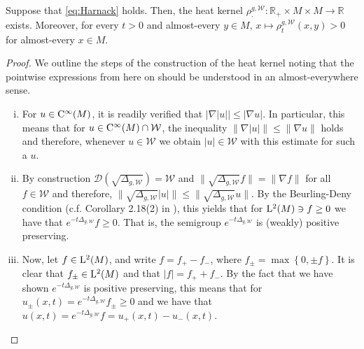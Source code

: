 \documentclass[AMS,STIX1COL]{WileyNJD-v2}
\numberwithin{equation}{section}
\renewcommand{\~}{\tilde}
\renewcommand{\-}{\bar}
\newcommand{\R}{\mathbb{R}}
\newcommand{\8}{\infty}
\newcommand{\cW}{\mathcal{W}}
\newcommand{\mdot}{\cdotp}
\newcommand{\dbrac}[1]{\left\{#1\right\}}
\newcommand{\modulus}[1]{|#1|}
\newcommand{\set}[1]{\dbrac{#1}}
\newcommand{\dom}{ {\mathcal{D}}}
\newcommand{\intersect}{\cap}
\newcommand{\norm}[1]{\| #1 \|}			%
\newcommand{\Lp}[2][{}]{{\rm L}^{#2}_{\rm #1}}		%
\newcommand{\Ck}[2][{}]{{\rm C}^{#2}_{\rm #1}}		%
\newcommand{\hk}{\rho}
\begin{document}
\begin{prop}
\label{prop:MainRed}
Suppose that \eqref{eq:Harnack} holds. Then, the heat
kernel $\hk^{g,\cW}_{\mdot}: \R_{+} \times M \times M \to \R$
exists. Moreover, for every $t > 0$ and almost-every $y \in M$,  $x\mapsto \hk^{g,\cW}_t(x,y) > 0$ for almost-every $x \in M$.
\end{prop} 
\begin{proof}
We outline the steps of the construction of the heat kernel
noting that the pointwise expressions from here on should be
understood in an almost-everywhere sense.
\begin{enumerate}[(i)]
\item For $u \in \Ck{\infty}(M)$, it is readily verified that 
	$\modulus{ \nabla \modulus{u}} \leq \modulus{ \nabla u}.$
	In particular, this means that 
	for $u \in \Ck{\infty}(M) \intersect \cW$,
	the inequality
	$\norm{\nabla \modulus{u}} \leq \norm{\nabla u}$ holds
	and therefore, whenever $u \in \cW$
	we obtain $\modulus{u} \in \cW$ 
	with this estimate for such a $u$.

\item 	By construction $\dom(\sqrt{\Delta_{g, \cW}}) = \cW$
	and $\norm{\sqrt{\Delta_{g,\cW}} f} = \norm{\nabla f}$
	for all $f \in \cW$ and therefore, 
	$\norm{\sqrt{\Delta_{g, \cW}} \modulus{u}} 
		\leq \norm{\sqrt{\Delta_{g, \cW}} u}$. 
	By the Beurling-Deny condition (c.f.  Corollary 2.18(2) in  \cite{El-Maati}), 
	this yields that for $\Lp{2}(M) \ni f \geq 0$
	we have that  $e^{-t \Delta_{g,\cW}} f \geq 0$. That is, the semigroup 
	$e^{-t \Delta_{g,\cW}}$ is (weakly) positive preserving.

\item Now, let $f \in \Lp{2}(M)$, and write
	$f = f_+ - f_-$, where $f_{\pm} = \max\set{0,\pm f}$.
	It is clear that $f_{\pm} \in \Lp{2}(M)$
	and that $\modulus{f} = f_+ + f_-$.
	By the fact that we have shown $e^{-t\Delta_{g,\cW}}$ 
	is positive preserving, this means that
	for $u_{\pm} (x,t) = e^{-t\Delta_{g,\cW}} f_{\pm} \geq 0$	
	and we have that $u(x,t) = e^{-t \Delta_{g,\cW}} f = u_+(x,t) - u_-(x,t)$.


\end{enumerate}
\end{proof}
\end{document}
